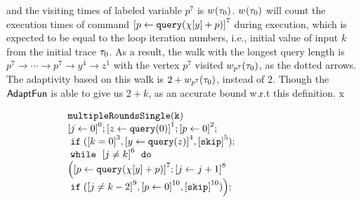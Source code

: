 \begin{example}
{    and the visiting times of labeled variable $p^7$ is 
    $w_{}(\mathtt{\tau}_0)$. $w_{}(\mathtt{\tau}_0)$ will count the execution times of command $\clabel{\assign{p}{\query(\chi[y]+p)} }^{7}$ during execution, which is expected to be equal to the loop iteration numbers, i.e., initial value of input $k$ from the initial trace $\mathtt{\tau}_0$.
    As a result, the walk with the longest query length 
    is
    $p^7  \to \cdots \to p^7 \to y^4  \to z^1 $ with the vertex $p^7$ visited $w_{p^7}(\mathtt{\tau}_0)$, as the dotted arrows. 
    The adaptivity based on this walk
    is $2 + w_{p^7}(\mathtt{\tau}_0)$, instead of $2$. 
    Though the $\textsf{AdaptFun}$ is able to give us $2 + k$,  as an accurate bound w.r.t this definition.
x}
        {\small
    \begin{figure}
     \centering
    \quad
    \begin{subfigure}{.35\textwidth}
    \begin{centering}
    $ \begin{array}{l}
            \kw{multipleRoundsSingle(k)}\\
               \clabel{ \assign{j}{0}}^{0} ; 
                \clabel{\assign{z}{\query(0)} }^{1} ;             
                \clabel{\assign{p}{0} }^{2} ; \\
                \eif(\clabel{ k = 0}^{3}, 
                \clabel{ \assign{y}{\query(z)}}^{4}, \clabel{\eskip}^5);\\
                \ewhile ~ \clabel{j \neq k}^{6} ~ \edo ~ \\
                \Big(
                 \clabel{\assign{p}{\query(\chi[y]+p)} }^{7}  ; 
                 \clabel{\assign{j}{j + 1}}^{8}\\
              \eif(\clabel{ j \neq k - 2}^{9}, 
              \clabel{ \assign{p}{0}}^{10} ,\clabel{\eskip}^{10})
         \Big);\\
            \end{array}
    $
    \caption{}
    \end{centering}
    \end{subfigure}
    \begin{subfigure}{.6\textwidth}
        \begin{centering}
\end{centering}
\end{subfigure}
\end{figure}}
\end{example}
